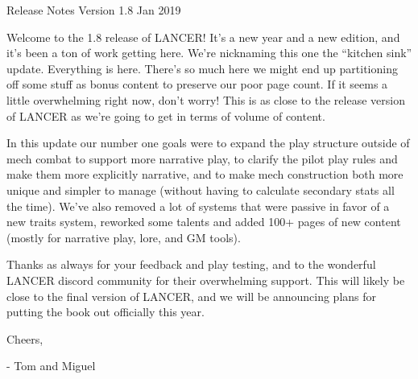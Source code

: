 Release Notes
Version 1.8
Jan 2019

Welcome to the 1.8 release of LANCER! It's a new year and a new edition, and it's been a ton of
work getting here. We're nicknaming this one the ``kitchen sink'' update. Everything is here. There's
so much here we might end up partitioning off some stuff as bonus content to preserve our poor
page count. If it seems a little overwhelming right now, don't worry! This is as close to the release
version of LANCER as we're going to get in terms of volume of content.

In this update our number one goals were to expand the play structure outside of mech combat to
support more narrative play, to clarify the pilot play rules and make them more explicitly narrative,
and to make mech construction both more unique and simpler to manage (without having to
calculate secondary stats all the time). We've also removed a lot of systems that were passive in
favor of a new traits system, reworked some talents and added 100+ pages of new content
(mostly for narrative play, lore, and GM tools).

Thanks as always for your feedback and play testing, and to the wonderful LANCER discord
community for their overwhelming support. This will likely be close to the final version of LANCER,
and we will be announcing plans for putting the book out officially this year.

Cheers,

- Tom and Miguel








